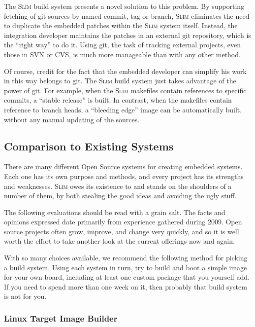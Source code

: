 \documentclass[a4paper,10pt]{article}
\newcommand{\slim}{\textsc{Slim}\xspace}
\begin{document}
    The \slim build system presents a novel solution to this
    problem. By supporting fetching of git sources by named commit,
    tag or branch, \slim eliminates the need to duplicate the embedded
    patches within the \slim system itself. Instead, the integration
    developer maintains the patches in an external git repository,
    which is the ``right way'' to do it. Using git, the task of
    tracking external projects, even those in SVN or CVS, is much more
    manageable than with any other method.

    Of course, credit for the fact that the embedded developer can
    simplify his work in this way belongs to git. The \slim build
    system just takes advantage of the power of git. For example, when
    the \slim makefiles contain references to specific commits, a
    ``stable release'' is built. In contrast, when the makefiles
    contain reference to branch heads, a ``bleeding edge'' image can
    be automatically built, without any manual updating of the
    sources.

\subsection{Comparison to Existing Systems}

    There are many different Open Source systems for creating embedded
    systems. Each one has its own purpose and methods, and every
    project has its strengths and weaknesses. \slim owes its existence
    to and stands on the shoulders of a number of them, by both
    stealing the good ideas and avoiding the ugly stuff.

    The following evaluations should be read with a grain salt. The
    facts and opinions expressed date primarily from experience
    gathered during 2009. Open source projects often grow, improve,
    and change very quickly, and so it is well worth the effort to
    take another look at the current offerings now and again.

    With so many choices available, we recommend the following method
    for picking a build system. Using each system in turn, try to
    build and boot a simple image for your own board, including at
    least one custom package that you yourself add. If you need to
    spend more than one week on it, then probably that build system is
    not for you.

\subsubsection{Linux Target Image Builder}
\end{document}
